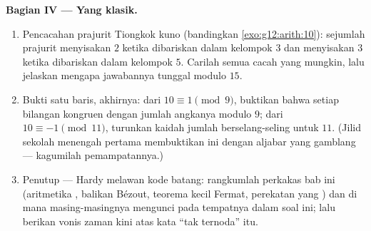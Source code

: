 \begin{problem}
\medskip
\noindent\textbf{Bagian IV --- Yang klasik.}
\begin{enumerate}[resume]
  \item Pencacahan prajurit Tiongkok kuno (bandingkan
        \cref{exo:g12:arith:10}): sejumlah prajurit menyisakan
        $2$ ketika dibariskan dalam kelompok $3$ dan menyisakan $3$
        ketika dibariskan dalam kelompok $5$. Carilah semua cacah yang
        mungkin, lalu jelaskan mengapa jawabannya tunggal modulo $15$.
  \item Bukti satu baris, akhirnya: dari $10 \equiv 1 \pmod 9$,
        buktikan bahwa setiap bilangan kongruen dengan jumlah angkanya
        modulo $9$; dari $10 \equiv -1 \pmod{11}$, turunkan
        kaidah jumlah berselang-seling untuk $11$. (Jilid sekolah
        menengah pertama membuktikan ini dengan aljabar yang gamblang ---
        kagumilah pemampatannya.)
  \item Penutup --- Hardy melawan kode batang: rangkumlah
        perkakas bab ini (aritmetika , balikan Bézout,
        teorema kecil Fermat, perekatan  yang ) dan
        di mana masing-masingnya mengunci pada tempatnya dalam soal ini;
        lalu berikan vonis zaman kini atas kata ``tak ternoda'' itu.

\end{enumerate}
\end{problem}
